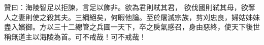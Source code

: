 \begin{pinyinscope}
 贊曰：海陵智足以拒諫，言足以飾非。欲為君則弒其君，
 欲伐國則弒其母，欲奪人之妻則使之殺其夫。三綱絕矣，何暇他論。至於屠滅宗族，剪刈忠良，婦姑姊妹盡入嬪御。方以三十二總管之兵圖一天下，卒之戾氣感召，身由惡終，使天下後世稱無道主以海陵為首。可不戒哉！可不戒哉！



\end{pinyinscope}